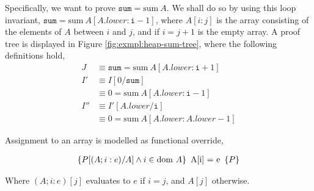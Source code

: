 \begin{example}
  Specifically, we want to prove $\mathtt{sum} = \mathrm{sum}~A$. We
  shall do so by using this loop invariant, $\mathtt{sum} =
  \mathrm{sum}~A[A.lower : \mathtt{i} - 1]$, where $A[i:j]$ is the
  array consisting of the elements of $A$ between $i$ and $j$, and if
  $i = j + 1$ is the empty array. A proof tree is displayed in Figure
  \ref{fig:exmpl:heap-sum-tree}, where the following definitions hold,
  \begin{align*}
    J &\equiv \mathtt{sum} = \mathrm{sum}~A[A.lower : \mathtt{i} + 1]\\
    I' &\equiv I[0/\mathtt{sum}]\\
    &\equiv 0 = \mathrm{sum}~A[A.lower : \mathtt{i} - 1]\\
    I'' &\equiv I'[A.lower/\mathtt{i}]\\
    &\equiv 0 = \mathrm{sum}~A[A.lower : A.lower - 1]
  \end{align*}
\end{example}

\begin{definition}
  Assignment to an array is modelled as functional override,

  \begin{align*}
    \left\{P[(A; i : e)/A] \land i \in \mathrm{dom}~A\right\}\ \mbox{A[i] = e}\ \left\{P\right\}
  \end{align*}

  Where $(A; i : e)[j]$ evaluates to $e$ if $i = j$, and $A[j]$
  otherwise.
\end{definition}

